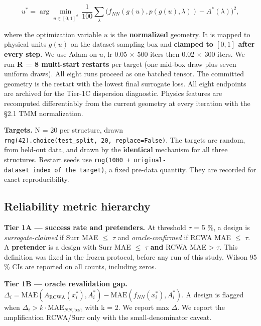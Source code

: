 \documentclass[11pt,a4paper]{article}
\begin{document}
\[
u^{*} = \arg\min_{u \in [0,1]^d}\ \frac{1}{100}\sum_\lambda
       \big(f_{NN}(g(u), p(g(u),\lambda)) - A^{*}(\lambda)\big)^2 ,
\]

where the optimization variable \(u\) is the \textbf{normalized} geometry. It is mapped to
physical units \(g(u)\) on the dataset sampling box and \textbf{clamped to \([0,1]\) after
every step}. We use Adam \cite{kingma201541} on \(u\), lr 0.05 \ensuremath{\times} 500 iters then 0.02 \ensuremath{\times} 300 iters.
We run \textbf{R = 8 multi-start restarts} per target (one mid-box draw plus seven uniform
draws). All eight runs proceed as one batched tensor. The committed geometry is the
restart with the lowest final surrogate loss. All eight endpoints are archived for
the Tier-1C dispersion diagnostic. Physics features are recomputed differentiably
from the current geometry at every iteration with the \S{}2.1 TMM normalization.

\textbf{Targets.} N = 20 per structure, drawn \texttt{rng(42).choice(test\_split,\ 20,\ replace=False)}. The targets are random, from held-out data, and drawn by the
\textbf{identical} mechanism for all three structures. Restart seeds use
\texttt{rng(1000\ +\ original-dataset\ index\ of\ the\ target)}, a fixed pre-data quantity. They
are recorded for exact reproducibility.

\subsection{Reliability metric hierarchy}\label{sec:2.3}

\textbf{Tier 1A --- success rate and pretenders.} At threshold \ensuremath{\tau} = 5 \%, a design is
\emph{surrogate-claimed} if Surr MAE \ensuremath{\leq} \ensuremath{\tau} and \emph{oracle-confirmed} if RCWA MAE \ensuremath{\leq} \ensuremath{\tau}. A
\textbf{pretender} is a design with Surr MAE \ensuremath{\leq} \ensuremath{\tau} \textbf{and} RCWA MAE \textgreater{} \ensuremath{\tau}. This definition
was fixed in the frozen protocol, before any run of this study. Wilson 95 \% CIs \cite{wilson192742}
are reported on all counts, including zeros.

\textbf{Tier 1B --- oracle revalidation gap.}
\(\Delta_i = \mathrm{MAE}(A_{\mathrm{RCWA}}(x_i^{*}), A_i^{*}) -
\mathrm{MAE}(f_{NN}(x_i^{*}), A_i^{*})\). A design is flagged when
\(\Delta_i > k\cdot\mathrm{MAE}_{NN,\text{test}}\) with k = 2. We report max \ensuremath{\Delta}. We
report the amplification RCWA/Surr only with the small-denominator caveat.
\end{document}
